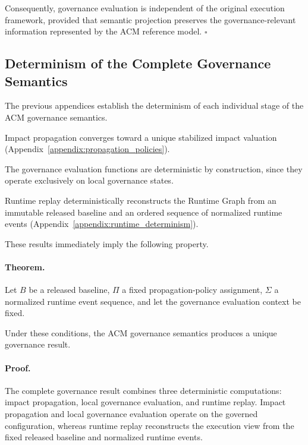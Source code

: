 \documentclass[10pt]{article}
\begin{document}
Consequently, governance evaluation is independent of the original execution framework, provided that semantic projection preserves the governance-relevant information represented by the ACM reference model.
\hfill$\square$

\subsection{Determinism of the Complete Governance Semantics}
\label{appendix:global_determinism}

The previous appendices establish the determinism of each individual stage of the ACM governance semantics.

Impact propagation converges toward a unique stabilized impact valuation (Appendix~\ref{appendix:propagation_policies}).

The governance evaluation functions are deterministic by construction, since they operate exclusively on local governance states.

Runtime replay deterministically reconstructs the Runtime Graph from an immutable released baseline and an ordered sequence of normalized runtime events
(Appendix~\ref{appendix:runtime_determinism}).

These results immediately imply the following property.

\paragraph*{Theorem.}

Let $B$ be a released baseline, $\Pi$ a fixed propagation-policy assignment,
$\Sigma$ a normalized runtime event sequence, and let the governance evaluation
context be fixed.

Under these conditions, the ACM governance semantics produces a unique
governance result.

\paragraph*{Proof.}

The complete governance result combines three deterministic computations:
impact propagation, local governance evaluation, and runtime replay. Impact
propagation and local governance evaluation operate on the governed
configuration, whereas runtime replay reconstructs the execution view from the
fixed released baseline and normalized runtime events.
\end{document}
